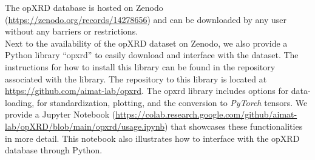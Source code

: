 The opXRD database is hosted on Zenodo (\url{https://zenodo.org/records/14278656}) and can be downloaded by any user without any barriers or restrictions. \\

Next to the availability of the opXRD dataset on Zenodo, we also provide a Python library ``opxrd'' to easily download and interface with the dataset. The instructions for how to install this library can be found in the repository associated with the library. The repository to this library is located at \url{https://github.com/aimat-lab/opxrd}. The opxrd library includes options for data-loading, for standardization, plotting, and the conversion to \emph{PyTorch} tensors. We provide a Jupyter Notebook (\url{https://colab.research.google.com/github/aimat-lab/opXRD/blob/main/opxrd/usage.ipynb})
that showcases these functionalities in more detail. This notebook also illustrates how to interface with the opXRD database through Python. 